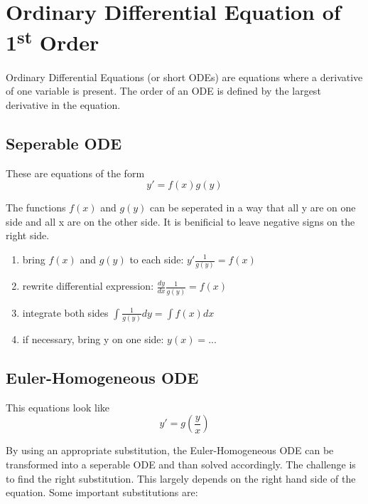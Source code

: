 \documentclass[./\jobname.tex]{subfiles}
\begin{document}
\chapter{Ordinary Differential Equation of 1\textsuperscript{st} Order}
Ordinary Differential Equations (or short ODEs) are equations where a derivative of one variable is present. The order of an ODE is defined by the largest derivative in the equation.

\section{Seperable ODE}
\label{ch:seperable_ode}
These are equations of the form 
\begin{equation}
y' = f(x)g(y)
\end{equation}

The functions $f(x)$ and $g(y)$ can be seperated in a way that all y are on one side and all x are on the other side. It is benificial to leave negative signs on the right side. 

\begin{enumerate}
	\item bring $f(x)$ and $g(y)$ to each side: $y'\frac{1}{g(y)} = f(x)$
	\item rewrite differential expression: $\frac{dy}{dx} \frac{1}{g(y)} = f(x)$
	\item integrate both sides $\int \frac{1}{g(y)} dy = \int f(x) dx$
	\item if necessary, bring y on one side: $y(x) = ...$
\end{enumerate}

\section{Euler-Homogeneous ODE}
This equations look like 
\begin{equation}
y' = g\left(\frac{y}{x}\right)
\end{equation}

By using an appropriate substitution, the Euler-Homogeneous ODE can be transformed into a seperable ODE and than solved accordingly. The challenge is to find the right substitution. This largely depends on the right hand side of the equation. Some important substitutions are: 


\begin{table}[H]
	\centering
	\noindent{}
\end{table}
\end{document}
